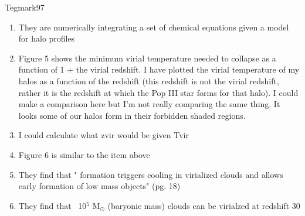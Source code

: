 \documentclass[a4paper,fleqn,usenatbib]{mnras}
\begin{document}
\li Tegmark97
\begin{enumerate}
	\item They are numerically integrating a set of chemical equations given a model for halo profiles
	\item Figure 5 shows the minimum virial temperature needed to collapse as a function of 1 + the virial redshift. I have plotted the virial temperature of my halos as a function of the redshift (this redshift is not the virial redshift, rather it is the redshift at which the Pop III star forms for that halo). I could make a comparison here but I'm not really comparing the same thing. It looks some of our halos form in their forbidden shaded regions.
	\item I could calculate what zvir would be given Tvir
	\item Figure 6 is similar to the item above
	\item They find that "\hh{} formation triggers cooling in virialized clouds and allows early formation of low mass objects" (pg. 18)
	\item They find that ~10$^{5}$ M$_{\odot}$ (baryonic mass) clouds can be virialzed at redshift 30
\end{enumerate}
\end{document}
